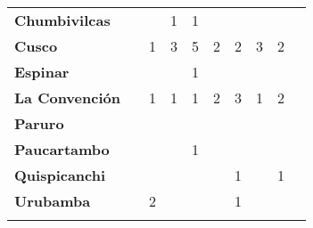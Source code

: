 \begin{tabular}{lccccccccc}
	\textbf{Chumbivilcas}                      												
	&\cellcolor[HTML]{FCC46C}					&\cellcolor[HTML]{FCC46C}
	&1											&1
	&\cellcolor[HTML]{FCC46C}					&\cellcolor[HTML]{FCC46C}
	&\cellcolor[HTML]{FCC46C}					&\cellcolor[HTML]{FCC46C}\\
	\textbf{Cusco}                            													
	&\cellcolor[HTML]{FCC46C}					&1					
	&3											&5											
	&2											&2		
	&3											&2\\								
	\textbf{Espinar}       					             									
	&\cellcolor[HTML]{FCC46C}					&\cellcolor[HTML]{FCC46C}
	&\cellcolor[HTML]{FCC46C}					&1
	&\cellcolor[HTML]{FCC46C}					&\cellcolor[HTML]{FCC46C}
	&\cellcolor[HTML]{FCC46C}					&\cellcolor[HTML]{FCC46C}\\	
	\textbf{La Convención}                      					
	&\cellcolor[HTML]{FCC46C}
	&1											&1
	&1											&2											
	&3											&1
	&2\\	
	\textbf{Paruro}                            					
	&\cellcolor[HTML]{FCC46C}					&\cellcolor[HTML]{FCC46C}					&\cellcolor[HTML]{FCC46C}					&\cellcolor[HTML]{FCC46C}					&\cellcolor[HTML]{FCC46C}					&\cellcolor[HTML]{FCC46C}
	&\cellcolor[HTML]{FCC46C} 					&\cellcolor[HTML]{FCC46C}\\
	\textbf{Paucartambo}               		                       							
	&\cellcolor[HTML]{FCC46C}					&\cellcolor[HTML]{FCC46C}
	&\cellcolor[HTML]{FCC46C}					&1
	&\cellcolor[HTML]{FCC46C}					&\cellcolor[HTML]{FCC46C}
	&\cellcolor[HTML]{FCC46C}					&\cellcolor[HTML]{FCC46C}\\
	\textbf{Quispicanchi}                                         	      					
	&\cellcolor[HTML]{FCC46C}					&\cellcolor[HTML]{FCC46C}
	&\cellcolor[HTML]{FCC46C}					&\cellcolor[HTML]{FCC46C}
	&\cellcolor[HTML]{FCC46C}					&1
	&\cellcolor[HTML]{FCC46C}					&1\\
	\textbf{Urubamba}                                                      	
	&\cellcolor[HTML]{FCC46C}					&2											&\cellcolor[HTML]{FCC46C}					&\cellcolor[HTML]{FCC46C}					&\cellcolor[HTML]{FCC46C}					&1											&\cellcolor[HTML]{FCC46C}					&\cellcolor[HTML]{FCC46C}\\						
	&\multicolumn{1}{l}{}                       &\multicolumn{1}{l}{}            &\multicolumn{1}{l}{}                         
	&\multicolumn{1}{l}{}                       &\multicolumn{1}{l}{}            &\multicolumn{1}{l}{}                       &\multicolumn{1}{l}{}                       &\multicolumn{1}{l}{}            			    
\end{tabular}
